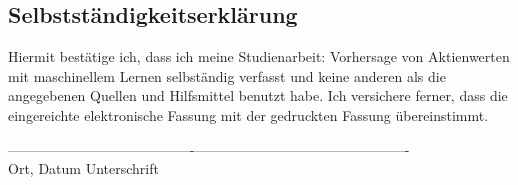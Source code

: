 
\begin{blackframebox}
	\section*{Selbstständigkeitserklärung}
	Hiermit bestätige ich, dass ich meine Studienarbeit: \grqq Vorhersage von Aktienwerten mit maschinellem Lernen\grqq{} selbständig verfasst und keine anderen als die angegebenen Quellen und Hilfsmittel benutzt habe. Ich versichere ferner, dass die eingereichte elektronische Fassung mit der gedruckten Fassung übereinstimmt.
	
	\vspace{4\baselineskip}
	----------------------------------------\hfill----------------------------------------------\\
	Ort, Datum \hfill Unterschrift
\end{blackframebox}